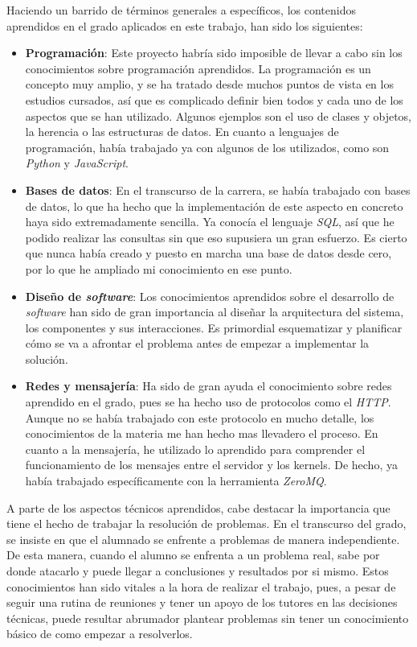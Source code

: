 \documentclass[11pt,spanish,listoffigures]{tfgetsinf}
\begin{document}
Haciendo un barrido de términos generales a específicos, los contenidos aprendidos en el grado aplicados en este trabajo, han sido los siguientes: 

\begin{itemize}

\item \textbf{Programación}: Este proyecto habría sido imposible de llevar a cabo sin los conocimientos sobre programación aprendidos. La programación es un concepto muy amplio, y se ha tratado desde muchos puntos de vista en los estudios cursados, así que es complicado definir bien todos y cada uno de los aspectos que se han utilizado. Algunos ejemplos son el uso de clases y objetos, la herencia o las estructuras de datos. En cuanto a lenguajes de programación, había trabajado ya con algunos de los utilizados, como son \textit{Python} y \textit{JavaScript}.

\item \textbf{Bases de datos}: En el transcurso de la carrera, se había trabajado con bases de datos, lo que ha hecho que la implementación de este aspecto en concreto haya sido extremadamente sencilla. Ya conocía el lenguaje \textit{SQL}, así que he podido realizar las consultas sin que eso supusiera un gran esfuerzo. Es cierto que nunca había creado y puesto en marcha una base de datos desde cero, por lo que he ampliado mi conocimiento en ese punto.

\item \textbf{Diseño de \textit{software}}: Los conocimientos aprendidos sobre el desarrollo de \textit{software} han sido de gran importancia al diseñar la arquitectura del sistema, los componentes y sus interacciones. Es primordial esquematizar y planificar cómo se va a afrontar el problema antes de empezar a implementar la solución.

\item \textbf{Redes y mensajería}: Ha sido de gran ayuda el conocimiento sobre redes aprendido en el grado, pues se ha hecho uso de protocolos como el \textit{HTTP}. Aunque no se había trabajado con este protocolo en mucho detalle, los conocimientos de la materia me han hecho mas llevadero el proceso. En cuanto a la mensajería, he utilizado lo aprendido para comprender el funcionamiento de los mensajes entre el servidor y los kernels. De hecho, ya había trabajado específicamente con la herramienta \textit{ZeroMQ}.

\end{itemize}

A parte de los aspectos técnicos aprendidos, cabe destacar la importancia que tiene el hecho de trabajar la resolución de problemas. En el transcurso del grado, se insiste en que el alumnado se enfrente a problemas de manera independiente. De esta manera, cuando el alumno se enfrenta a un problema real, sabe por donde atacarlo y puede llegar a conclusiones y resultados por si mismo. Estos conocimientos han sido vitales a la hora de realizar el trabajo, pues, a pesar de seguir una rutina de reuniones y tener un apoyo de los tutores en las decisiones técnicas, puede resultar abrumador plantear problemas sin tener un conocimiento básico de como empezar a resolverlos.
\end{document}
